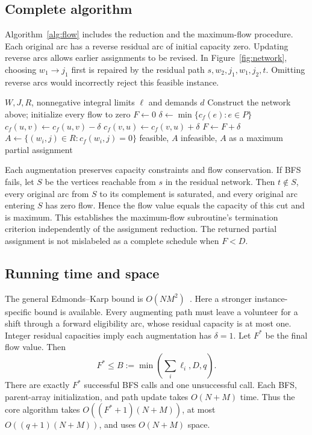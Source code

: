 \documentclass[sigconf,nonacm]{acmart}
\begin{document}
\subsection{Complete algorithm}
Algorithm~\ref{alg:flow} includes the reduction and the maximum-flow procedure.
Each original arc has a reverse residual arc of initial capacity zero.
Updating reverse arcs allows earlier assignments to be revised. In
Figure~\ref{fig:network}, choosing $w_1\to j_1$ first is repaired by the
residual path $s,w_2,j_1,w_1,j_2,t$. Omitting reverse arcs would incorrectly
reject this feasible instance.

\begin{algorithm}[t]
\caption{Staff volunteers using Edmonds--Karp}\label{alg:flow}
\begin{algorithmic}[1]
\Require $W,J,R$, nonnegative integral limits $\ell$ and demands $d$
\State Construct the network above; initialize every flow to zero
\State $F\gets0$
  \State $\delta\gets\min\{c_f(e):e\in P\}$
    \State $c_f(u,v)\gets c_f(u,v)-\delta$
    \State $c_f(v,u)\gets c_f(v,u)+\delta$
  \EndFor
  \State $F\gets F+\delta$
\EndWhile
\State $A\gets\{(w_i,j)\in R: c_f(w_i,j)=0\}$
  \State \Return feasible, $A$
\Else
  \State \Return infeasible, $A$ as a maximum partial assignment
\EndIf
\end{algorithmic}
\end{algorithm}

Each augmentation preserves capacity constraints and flow conservation.
If BFS fails, let $S$ be the vertices reachable from $s$ in the residual
network. Then $t\notin S$, every original arc from $S$ to its complement is
saturated, and every original arc entering $S$ has zero flow. Hence the flow
value equals the capacity of this cut and is maximum. This establishes the
maximum-flow subroutine's termination criterion independently of the
assignment reduction. The returned partial assignment is not mislabeled as a
complete schedule when $F<D$.

\subsection{Running time and space}
The general Edmonds--Karp bound is $O(NM^2)$~\cite{edmondskarp}.
Here a stronger instance-specific bound is available. Every augmenting path
must leave a volunteer for a shift through a forward eligibility arc, whose
residual capacity is at most one. Integer residual capacities imply each
augmentation has $\delta=1$. Let $F^*$ be the final flow value. Then
\[
F^*\le B:=\min\left(\sum_i\ell_i,D,q\right).
\]
There are exactly $F^*$ successful BFS calls and one unsuccessful call. Each
BFS, parent-array initialization, and path update takes $O(N+M)$ time. Thus
the core algorithm takes $O((F^*+1)(N+M))$, at most
$O((q+1)(N+M))$, and uses $O(N+M)$ space.
\end{document}
